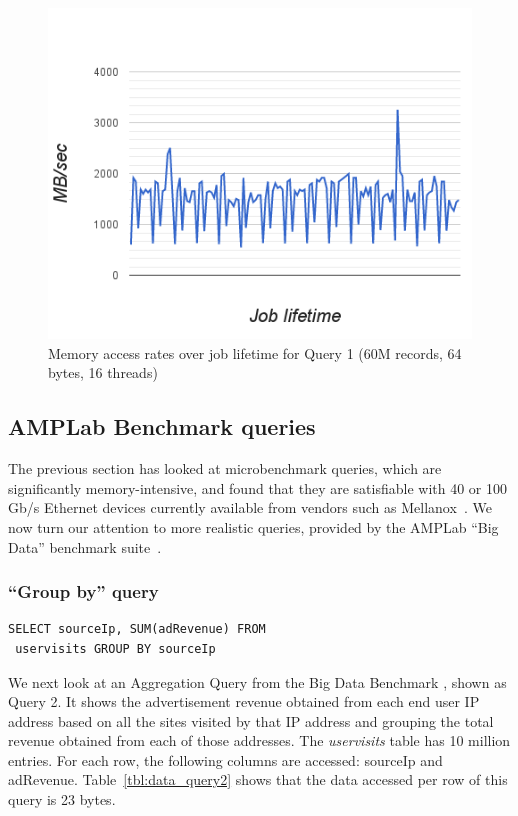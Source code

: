\documentclass[9pt]{sig-alternate-05-2015}
\begin{document}
\begin{figure}[h]
\centering
\includegraphics[width=\columnwidth]{time-mem-access-rates-count-64bytes-16threads.png}
\caption{\label{fig:memrate}Memory access rates over job lifetime for Query 1 (60M records, 64 bytes, 16 threads)}
\end{figure}

\subsection{AMPLab Benchmark queries}

The previous section has looked at microbenchmark queries, which are
significantly memory-intensive, and found that they are satisfiable with 40 or
100 Gb/s Ethernet devices currently available from vendors such as
Mellanox~\cite{mellanox100g}.  We now turn our attention to more realistic
queries, provided by the AMPLab ``Big Data'' benchmark
suite~\cite{amplab_benchmark}.

\subsubsection{``Group by'' query}

\begin{Verbatim}[frame=single,label=Query 2]
SELECT sourceIp, SUM(adRevenue) FROM
 uservisits GROUP BY sourceIp
\end{Verbatim}

We next look at an Aggregation Query from the Big Data Benchmark
\cite{bigDataBenchmark}, shown as Query 2.  It shows the advertisement revenue
obtained from each end user IP address based on all the sites visited by that
IP address and grouping  the total revenue obtained from each of those
addresses.  The {\em uservisits} table has 10 million entries. For each row,
the following columns are accessed: sourceIp and adRevenue.
Table~\ref{tbl:data_query2} shows that the data accessed per row of this query
is 23 bytes.
\end{document}
